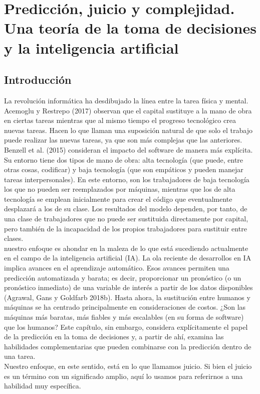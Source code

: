 \chapter{Predicción, juicio y complejidad. Una teoría de la toma de decisiones y la inteligencia artificial}

\section{Introducción}
La revolución informática ha desdibujado la línea entre la tarea física y mental. Acemoglu y Restrepo (2017) observan que el capital sustituye a la mano de obra en ciertas tareas mientras que al mismo tiempo el progreso tecnológico crea nuevas tareas. Hacen lo que llaman una suposición natural de que solo el trabajo puede realizar las nuevas tareas, ya que son más complejas que las anteriores. Benzell et al. (2015) consideran el impacto del software de manera más explícita. Su entorno tiene dos tipos de mano de obra: alta tecnología (que puede, entre otras cosas, codificar) y baja tecnología (que son empáticos y pueden manejar tareas interpersonales). En este entorno, son los trabajadores de baja tecnología los que no pueden ser reemplazados por máquinas, mientras que los de alta tecnología se emplean inicialmente para crear el código que eventualmente desplazará a los de su clase. Los resultados del modelo dependen, por tanto, de una clase de trabajadores que no puede ser sustituida directamente por capital, pero también de la incapacidad de los propios trabajadores para sustituir entre clases.\\
nuestro enfoque es ahondar en la maleza de lo que está sucediendo actualmente en el campo de la inteligencia artificial (IA). La ola reciente de desarrollos en IA implica avances en el aprendizaje automático. Esos avances permiten una predicción automatizada y barata; es decir, proporcionar un pronóstico (o un pronóstico inmediato) de una variable de interés a partir de los datos disponibles (Agrawal, Gans y Goldfarb 2018b). Hasta ahora, la sustitución entre humanos y máquinas se ha centrado principalmente en consideraciones de costos. ¿Son las máquinas más baratas, más fiables y más escalables (en su forma de software) que los humanos? Este capítulo, sin embargo, considera explícitamente el papel de la predicción en la toma de decisiones y, a partir de ahí, examina las habilidades complementarias que pueden combinarse con la predicción dentro de una tarea.\\
Nuestro enfoque, en este sentido, está en lo que llamamos juicio. Si bien el juicio es un término con un significado amplio, aquí lo usamos para referirnos a una habilidad muy específica. \\
